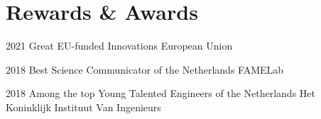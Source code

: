 \documentclass[print]{styles/friggeri-cv-mac} %
\begin{document}
\section{Rewards \& Awards}\vspace{-5pt}

\begin{entrylist}
	
\vspace{-0.3cm}
\entry
{2021}
{Great EU-funded Innovations}
{European Union}

\vspace{-0.3cm}
\entry
{2018}
{Best Science Communicator of the Netherlands}
{FAMELab}

\vspace{-0.3cm}
\entry
{2018}
{Among the top Young Talented Engineers of the Netherlands}
{Het Koninklijk Instituut Van Ingenieurs}

%
%
%
%
%
%
%
%
%
%

\end{entrylist}
\end{document}
